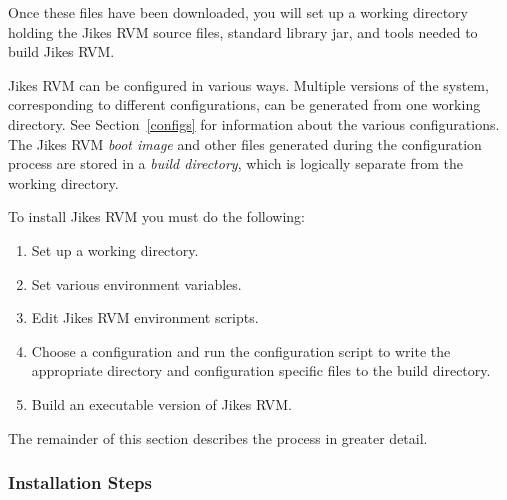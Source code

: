 Once these files have been downloaded, you will set up 
a working directory holding the Jikes RVM source files, standard
library jar, and tools needed to build Jikes RVM. 

Jikes RVM can be configured in various ways. Multiple versions of the system,
corresponding to different configurations, can be generated from 
one working directory. See Section~\ref{configs} for information about the 
various 
configurations.
The Jikes RVM  {\em boot image} and other files generated during the 
configuration process
are stored in a {\em build directory}, which is logically separate from 
the working directory. 

To install Jikes RVM  you must do the following:
\begin{enumerate}
\item Set up a working directory.
\item Set various environment variables.
\item Edit Jikes RVM environment scripts.
\item Choose a configuration and run the configuration script to write
the appropriate directory and configuration specific files to the
build directory.
\item Build an executable version of Jikes RVM.
\end{enumerate}

The remainder of this section describes the process in greater detail.

\JikesTMFooter

\subsubsection{Installation Steps}

